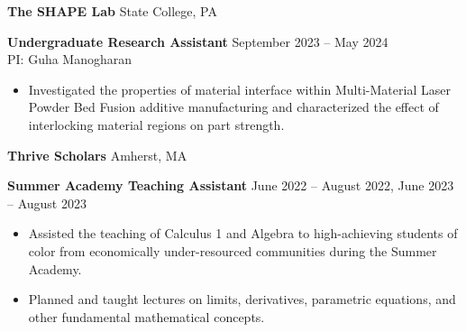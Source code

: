 \vspace{12pt}

\textbf{The SHAPE Lab} \hfill State College, PA

\textbf{Undergraduate Research Assistant} \hfill September 2023 – May 2024\\
PI: Guha Manogharan
\begin{itemize}[noitemsep, topsep=0pt, partopsep=0pt, parsep=0pt]

    \item Investigated the properties of material interface within Multi-Material Laser Powder Bed Fusion additive manufacturing and characterized the effect of interlocking material regions on part strength.
    

    
\end{itemize}

\vspace{12pt}

\textbf{Thrive Scholars} \hfill Amherst, MA

\textbf{Summer Academy Teaching Assistant} \hfill June 2022 – August 2022, June 2023 -- August 2023
\begin{itemize}[noitemsep, topsep=0pt, partopsep=0pt, parsep=0pt]
    \item Assisted the teaching of Calculus 1 and Algebra to high-achieving students of color from economically under-resourced communities during the Summer Academy.
    \item Planned and taught lectures on limits, derivatives, parametric equations, and other fundamental mathematical concepts.
\end{itemize}
